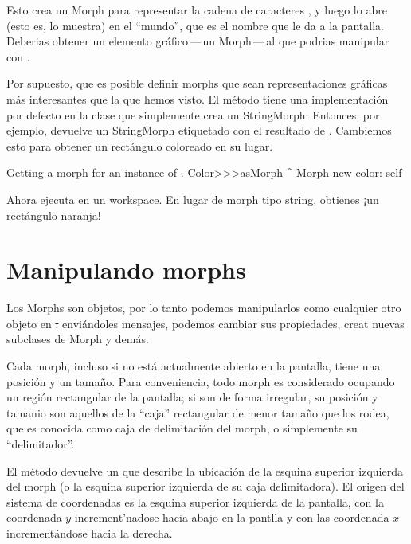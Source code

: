 \documentclass[a4paper,10pt,twoside]{book}
\begin{document}
Esto crea un Morph para representar la cadena de caracteres , y luego lo abre (esto es, lo muestra) en el ``mundo'', que es el nombre que \pharo le da a la pantalla.
Deberias obtener un elemento gráfico\,---\,un Morph\,---\,al que podrias manipular con \metaclick.

Por supuesto, que es posible definir morphs que sean representaciones gr\'aficas  m\'as interesantes que la que hemos visto.
El m\'etodo  tiene una implementaci\'on por defecto en la clase   que simplemente crea un StringMorph.
Entonces, por ejemplo,  devuelve un StringMorph etiquetado con el resultado de  .
Cambiemos esto para obtener un rect\'angulo coloreado en su lugar.


\begin{method}{Getting a morph for an instance of .}
Color>>>asMorph
	^ Morph new color: self
\end{method}
\noindent
Ahora ejecuta   en un workspace. En lugar de morph tipo string, obtienes ¡un rect\'angulo naranja!



\section{Manipulando morphs}

Los Morphs son objetos, por lo tanto podemos manipularlos como cualquier otro objeto en \st: envi\'andoles mensajes, podemos cambiar sus propiedades, creat nuevas subclases de Morph y demás.

Cada morph, incluso si no est\'a actualmente abierto en la pantalla, tiene una posición y un tamaño.
Para conveniencia, todo morph es considerado ocupando un regi\'on rectangular de la pantalla; si son de forma irregular, su posici\'on y tamanio son aquellos de la ``caja'' rectangular de menor tamaño que los rodea, que es conocida como caja de delimitaci\'on del morph, o simplemente su ``delimitador''.


El método  devuelve un  que describe la ubicaci\'on de la esquina superior izquierda del morph  (o la esquina superior izquierda de su caja delimitadora).
El origen del sistema de coordenadas es la esquina superior izquierda de la pantalla, con la coordenada $y$  increment'nadose hacia abajo en la pantlla y con las coordenada $x$ increment\'andose hacia la derecha.
\end{document}

